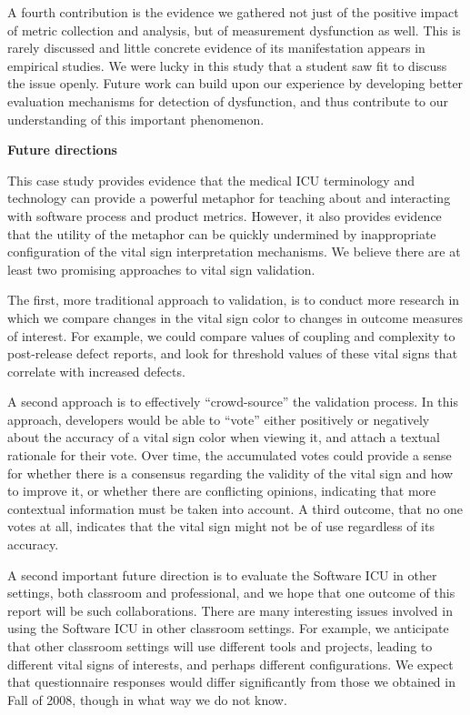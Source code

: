 \documentclass{acm_proc_article-sp}
\begin{document}
A fourth contribution is the evidence we gathered not just of the positive
impact of metric collection and analysis, but of measurement dysfunction as
well.  This is rarely discussed and little concrete evidence of its
manifestation appears in empirical studies.  We were lucky in this study
that a student saw fit to discuss the issue openly.  Future work can build
upon our experience by developing better evaluation mechanisms for
detection of dysfunction, and thus contribute to our understanding of this
important phenomenon.

{\bf Future directions}

This case study provides evidence that the medical ICU terminology and
technology can provide a powerful metaphor for teaching about and
interacting with software process and product metrics.  However, it also
provides evidence that the utility of the metaphor can be quickly
undermined by inappropriate configuration of the vital sign interpretation
mechanisms.  We believe there are at least two promising approaches to
vital sign validation.

The first, more traditional approach to validation, is to conduct more
research in which we compare changes in the vital sign color to changes in
outcome measures of interest.  For example, we could compare values of
coupling and complexity to post-release defect reports, and look for
threshold values of these vital signs that correlate with increased
defects.

A second approach is to effectively ``crowd-source'' the validation
process.  In this approach, developers would be able to ``vote'' either
positively or negatively about the accuracy of a vital sign color when
viewing it, and attach a textual rationale for their vote.  Over time, the
accumulated votes could provide a sense for whether there is a consensus
regarding the validity of the vital sign and how to improve it, or whether
there are conflicting opinions, indicating that more contextual information
must be taken into account.  A third outcome, that no one votes at all,
indicates that the vital sign might not be of use regardless of its
accuracy.

A second important future direction is to evaluate the Software ICU in other
settings, both classroom and professional, and we hope that one outcome of
this report will be such collaborations.  There are many interesting issues
involved in using the Software ICU in other classroom settings. For
example, we anticipate that other classroom settings will use different
tools and projects, leading to different vital signs of interests, and
perhaps different configurations.  We expect that questionnaire
responses would differ significantly from those we obtained in Fall of
2008, though in what way we do not know.
\end{document}

